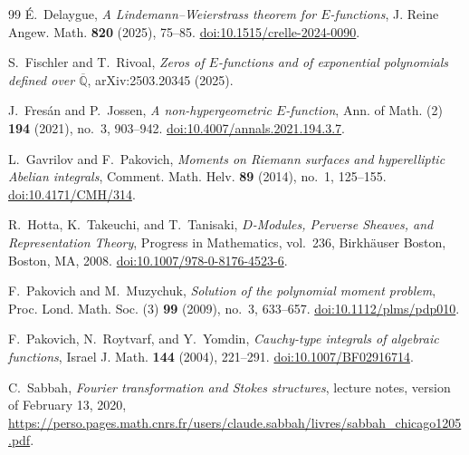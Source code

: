 \documentclass[11pt]{article}
\numberwithin{equation}{section}
\theoremstyle{definition}
\theoremstyle{remark}
\begin{document}
\begin{thebibliography}{99}
\'E.~Delaygue,
\emph{A Lindemann--Weierstrass theorem for $E$-functions},
J. Reine Angew. Math. \textbf{820} (2025), 75--85.
\href{https://doi.org/10.1515/crelle-2024-0090}{doi:10.1515/crelle-2024-0090}.

S.~Fischler and T.~Rivoal,
\emph{Zeros of $E$-functions and of exponential polynomials defined over
$\overline{\mathbb Q}$},
arXiv:2503.20345 (2025).

J.~Fres\'an and P.~Jossen,
\emph{A non-hypergeometric $E$-function},
Ann. of Math. (2) \textbf{194} (2021), no.~3, 903--942.
\href{https://doi.org/10.4007/annals.2021.194.3.7}{doi:10.4007/annals.2021.194.3.7}.

L.~Gavrilov and F.~Pakovich,
\emph{Moments on Riemann surfaces and hyperelliptic Abelian integrals},
Comment. Math. Helv. \textbf{89} (2014), no.~1, 125--155.
\href{https://doi.org/10.4171/CMH/314}{doi:10.4171/CMH/314}.

R.~Hotta, K.~Takeuchi, and T.~Tanisaki,
\emph{$D$-Modules, Perverse Sheaves, and Representation Theory},
Progress in Mathematics, vol.~236,
Birkh\"auser Boston, Boston, MA, 2008.
\href{https://doi.org/10.1007/978-0-8176-4523-6}{doi:10.1007/978-0-8176-4523-6}.

F.~Pakovich and M.~Muzychuk,
\emph{Solution of the polynomial moment problem},
Proc. Lond. Math. Soc. (3) \textbf{99} (2009), no.~3, 633--657.
\href{https://doi.org/10.1112/plms/pdp010}{doi:10.1112/plms/pdp010}.

F.~Pakovich, N.~Roytvarf, and Y.~Yomdin,
\emph{Cauchy-type integrals of algebraic functions},
Israel J. Math. \textbf{144} (2004), 221--291.
\href{https://doi.org/10.1007/BF02916714}{doi:10.1007/BF02916714}.

C.~Sabbah,
\emph{Fourier transformation and Stokes structures},
lecture notes, version of February 13, 2020,
\url{https://perso.pages.math.cnrs.fr/users/claude.sabbah/livres/sabbah_chicago1205.pdf}.

\end{thebibliography}
\end{document}
